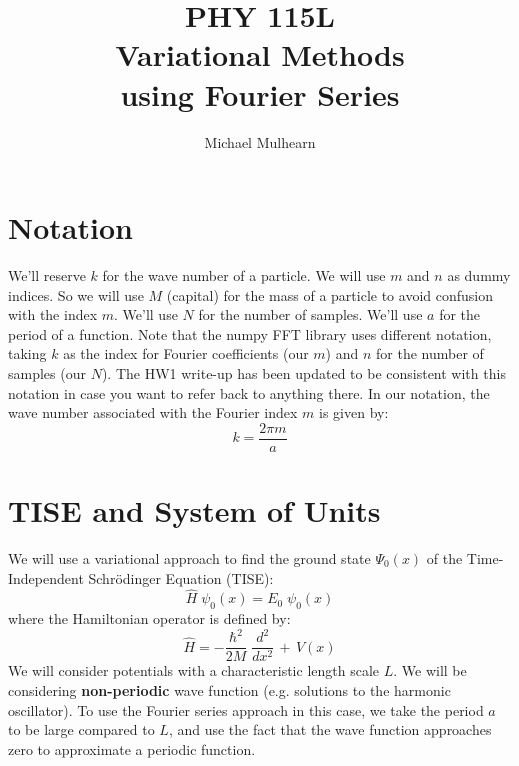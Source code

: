 \documentclass[12pt]{article}
\begin{document}
\newcommand{\ihbar}{\ensuremath{i \hbar}}
\newcommand{\Pss}{\ensuremath{\Psi^*}}
\newcommand{\dPsidt}{\ensuremath{ \frac{\partial \Psi}{\partial t} }}
\newcommand{\dPsidx}{\ensuremath{ \frac{\partial \Psi}{\partial x} }}
\newcommand{\ddPsidx}{\ensuremath{ \frac{\partial^2 \Psi}{\partial x^2} }}
\newcommand{\dPssdt}{\ensuremath{ \frac{\partial \Psi^*}{\partial t} }}
\newcommand{\dPssdx}{\ensuremath{ \frac{\partial \Psi^*}{\partial x} }}
\newcommand{\ddPssdx}{\ensuremath{ \frac{\partial^2 \Psi^*}{\partial x^2} }}

\newcommand{\dphidt}{\ensuremath{ \frac{d \phi}{dt} }}
\newcommand{\dpsidx}{\ensuremath{ \frac{d \psi}{dx} }}
\newcommand{\ddpsidx}{\ensuremath{ \frac{d^2 \psi}{dx^2} }}


\title{PHY 115L \\ Variational Methods \\ using Fourier Series }
\author{Michael Mulhearn}

\maketitle



\section{Notation}

We'll reserve $k$ for the wave number of a particle.  We will use $m$
and $n$ as dummy indices.  So we will use $M$ (capital) for the mass
of a particle to avoid confusion with the index $m$.  We'll use $N$
for the number of samples.  We'll use $a$ for the period of a
function.  Note that the numpy FFT library uses different notation,
taking $k$ as the index for Fourier coefficients (our $m$) and $n$ for
the number of samples (our $N$).  The HW1 write-up has been updated to
be consistent with this notation in case you want to refer back to
anything there.  In our notation, the wave number associated with the
Fourier index $m$ is given by:
\begin{equation}
k = \frac{2 \pi m}{a}
\end{equation}

\section{TISE and System of Units}

\noindent
We will use a variational approach to find the ground state
$\Psi_0(x)$ of the Time-Independent Schr\"odinger Equation (TISE):
$$\hat{H} \; \psi_0(x) = E_0 \; \psi_0(x)$$
where the Hamiltonian operator is defined by:
\begin{equation}
\hat{H} = -\frac{\hbar^2}{2 M} \; \frac{d^2}{dx^2} \, + \, V(x)
\end{equation}
We will consider potentials with a characteristic length scale $L$.
We will be considering {\bf non-periodic} wave function
(e.g. solutions to the harmonic oscillator).  To use the Fourier
series approach in this case, we take the period $a$ to be large
compared to $L$, and use the fact that the wave function approaches
zero to approximate a periodic function.
\end{document}
